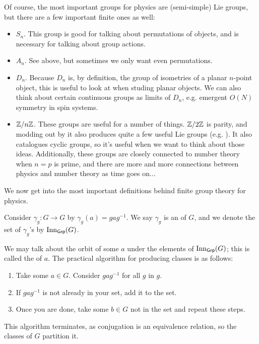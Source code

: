 \documentclass[11pt]{article}
\begin{document}
\begin{eexample}
    Of course, the most important groups for physics are (semi-simple)
    Lie groups, but there are a few important finite ones as well:
    \begin{itemize}
        \item $S_n$. This group is good for talking about permutations
        of objects, and is necessary for talking about group actions.
        \item $A_n$. See above, but sometimes we only want even permutations.
        \item $D_n$. Because $D_n$ is, by definition, the group of isometries
        of a planar $n$-point object, this is useful to look at when studing
        planar objects. We can also think about certain continuous groups
        as limits of $D_n$, e.g. emergent $O(N)$ symmetry in spin systems.
        \item $\mathbb{Z}/n\mathbb{Z}$. These groups are useful for a number of things.
        $\mathbb{Z}/2\mathbb{Z}$ is parity, and modding out by it also produces quite
        a few useful Lie groups (e.g. ). It also
        catalogues cyclic groups, so it's useful when we want to think about
        those ideas. Additionally, these groups are closely connected to number
        theory when $n = p$ is prime, and there are more and more connections
        between physics and number theory as time goes on$\ldots$
    \end{itemize}
\end{eexample}

We now get into the most important definitions behind finite
group theory for physics.

\begin{definition}
    Consider $\gamma_g \colon G \to G$ by $\gamma_g(a) = g a g^{-1}$.
    We say $\gamma_g$ is an  of $G$, and we
    denote the set of $\gamma_g$'s by $\operatorname{Inn}_{\text{\text{\sffamily{Grp}}}}(G)$.
\end{definition}

We may talk about the orbit of some $a$ under the elements of 
$\operatorname{Inn}_{\text{\text{\sffamily{Grp}}}}(G)$; this is called the
 of $a$. The practical algorithm for producing classes
is as follows:
\begin{enumerate}
    \item Take some $a \in G$. Consider $g a g^{-1}$ for all $g$
    in $g$.
    \item If $g a g^{-1}$ is not already in your set, add it to the
    set.
    \item Once you are done, take some $b \in G$ not in the set
    and repeat these steps.
\end{enumerate}
This algorithm terminates, as conjugation is an equivalence relation,
so the classes of $G$ partition it.
\end{document}

